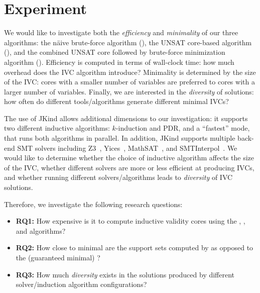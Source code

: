 \section{Experiment}
\label{sec:experiment}


We would like to investigate both the {\em efficiency} and {\em
  minimality} of our three algorithms: the n{\"a}ive brute-force
algorithm (\bfalg), the UNSAT core-based algorithm (\ucalg), and the
combined UNSAT core followed by brute-force minimization algorithm
(\ucbfalg). Efficiency is computed in terms of wall-clock time: how
much overhead does the IVC algorithm introduce? Minimality is
determined by the size of the IVC: cores with a smaller number of
variables are preferred to cores with a larger number of variables.
Finally, we are interested in the {\em diversity} of solutions: how
often do different tools/algorithms generate different minimal IVCs?

The use of JKind allows additional dimensions to our investigation: it supports two different inductive algorithms: $k$-induction and PDR, and a ``fastest'' mode, that runs both algorithms in parallel.  In addition, JKind supports multiple back-end SMT solvers including Z3~\cite{DeMoura08:z3}, Yices~\cite{Dutertre06:yices}, MathSAT~\cite{Cimatti2013:MathSAT}, and SMTInterpol~\cite{Christ2012:SMTInterpol}.  We would like to determine whether the choice of inductive algorithm affects the size of the IVC, whether different solvers are more or less efficient at producing IVCs, and whether running different solvers/algorithms leads to {\em diversity} of IVC solutions.

Therefore, we investigate the following research questions:
\begin{itemize}
    \item \textbf{RQ1:} How expensive is it to compute inductive validity cores using the \bfalg, \ucalg, and \ucbfalg algorithms?
    \item \textbf{RQ2:} How close to minimal are the support sets computed by \ucalg as opposed to the (guaranteed minimal) \ucbfalg?
    \item \textbf{RQ3:} How much {\em diversity} exists in the solutions produced by different solver/induction algorithm configurations?
\end{itemize}

